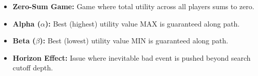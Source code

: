 \documentclass[12pt,a4paper]{article}
\begin{document}
\begin{tcolorbox}[defbox, title={\textbf{One-Line Definitions}}]
  \begin{itemize}[leftmargin=*, noitemsep]
    \item \textbf{Zero-Sum Game:} Game where total utility across all players sums to zero.
    \item \textbf{Alpha ($\alpha$):} Best (highest) utility value MAX is guaranteed along path.
    \item \textbf{Beta ($\beta$):} Best (lowest) utility value MIN is guaranteed along path.
    \item \textbf{Horizon Effect:} Issue where inevitable bad event is pushed beyond search cutoff depth.
  \end{itemize}
\end{tcolorbox}
\end{document}

